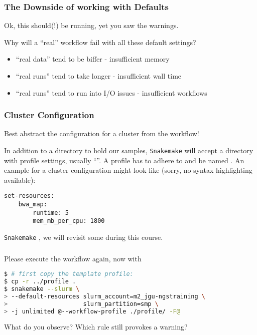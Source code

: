 \begin{frame}
  \frametitle{The Downside of working with Defaults}
  Ok, this should(!) be running, yet you saw the warnings. 
  \begin{question}
  	Why will a ``real'' workflow fail with all these default settings?
  \end{question}
  \pause
  \begin{itemize}
   \item ``real data'' tend to be biffer - insufficient memory
   \item ``real runs'' tend to take longer - insufficient wall time
   \item ``real runs'' tend to run into I/O issues - insufficient workflows
  \end{itemize}
\end{frame}


\begin{frame}[fragile]
  \frametitle{Cluster Configuration}
  \begin{hint}
  	Best abstract the configuration for a cluster from the workflow!
  \end{hint}
  In addition to a  directory to hold our samples, \texttt{Snakemake} will accept a directory with profile settings, usually ``''.
  \pause
  A profile has to adhere to  and be named . An example for a cluster configuration might look like (sorry, no syntax highlighting available):
  \begin{lstlisting}[style=Plain]
set-resources:
    bwa_map:
        runtime: 5
        mem_mb_per_cpu: 1800
  \end{lstlisting}
  \pause
  
  \texttt{Snakemake} , we will revisit some during this course.

\end{frame}

\begin{frame}[fragile]
  \frametitle{}
  Please execute the workflow again, now with 
  \begin{lstlisting}[language=Bash, style=Shell, basicstyle=\footnotesize]
$ # first copy the template profile:
$ cp -r ../profile .
$ snakemake --slurm \
> --default-resources slurm_account=m2_jgu-ngstraining \
>                     slurm_partition=smp \
> -j unlimited @--workflow-profile ./profile/ -F@
  \end{lstlisting}
  \begin{question}
  	What do you observe? Which rule still provokes a warning?
  \end{question}
\end{frame}

